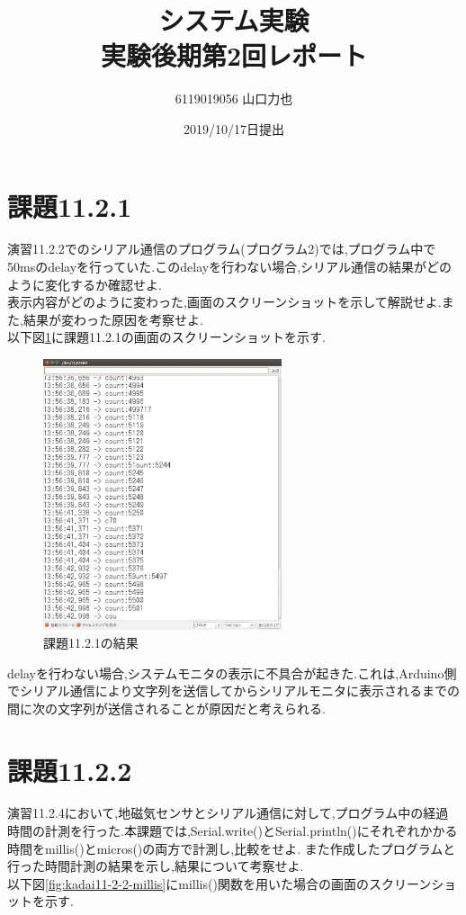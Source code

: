 \documentclass{jarticle}
\title{{システム実験}\\実験後期第2回レポート}
\author{6119019056 山口力也}
\date{2019/10/17日提出}
\begin{document}
\maketitle
\section{課題11.2.1}
演習11.2.2でのシリアル通信のプログラム(プログラム2)では,プログラム中で50msのdelayを行っていた.このdelayを行わない場合,シリアル通信の結果がどのように変化するか確認せよ. \\
表示内容がどのように変わった,画面のスクリーンショットを示して解説せよ.また,結果が変わった原因を考察せよ. \\
以下図\ref{fig:kadai11-2-1}に課題11.2.1の画面のスクリーンショットを示す.

\begin{figure}[H]
\begin{center}
\includegraphics[width=7.0cm]{images/kadai11-2-1.png}
\caption{課題11.2.1の結果}
\label{fig:kadai11-2-1}
\end{center}
\end{figure}

delayを行わない場合,システムモニタの表示に不具合が起きた.これは,Arduino側でシリアル通信により文字列を送信してからシリアルモニタに表示されるまでの間に次の文字列が送信されることが原因だと考えられる.

\section{課題11.2.2}
演習11.2.4において,地磁気センサとシリアル通信に対して,プログラム中の経過時間の計測を行った.本課題では,Serial.write()とSerial.println()にそれぞれかかる時間をmillis()とmicros()の両方で計測し,比較をせよ. また作成したプログラムと行った時間計測の結果を示し,結果について考察せよ.\\
以下図\ref{fig:kadai11-2-2-millis}にmillis()関数を用いた場合の画面のスクリーンショットを示す.
\end{document}
